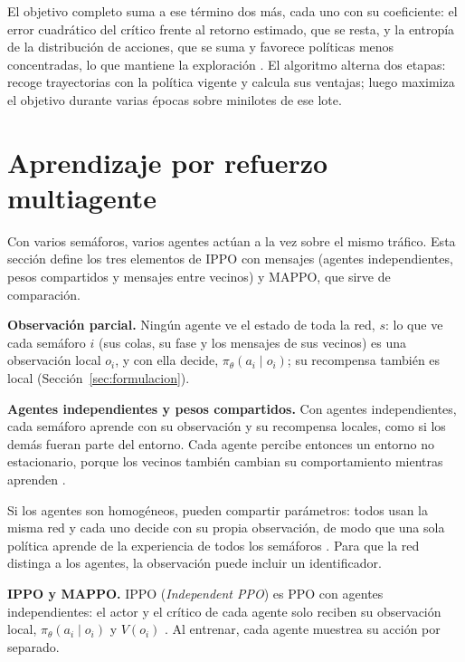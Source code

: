 El objetivo completo suma a ese término dos más, cada uno con su coeficiente: el error cuadrático
del crítico frente al retorno estimado, que se resta, y la entropía de la distribución de
acciones, que se suma y favorece políticas menos concentradas, lo que mantiene la exploración
\citep{Schulman2017_PPO}. El algoritmo alterna dos etapas: recoge trayectorias con la política
vigente y calcula sus ventajas; luego maximiza el objetivo durante varias épocas sobre minilotes
de ese lote.

\section{Aprendizaje por refuerzo multiagente}
\label{sec:marl}

Con varios semáforos, varios agentes actúan a la vez sobre el mismo tráfico. Esta sección define
los tres elementos de IPPO con mensajes (agentes independientes, pesos compartidos y mensajes
entre vecinos) y MAPPO, que sirve de comparación.

\noindent\textbf{Observación parcial.} Ningún agente ve el estado de toda la red, $s$: lo que ve
cada semáforo $i$ (sus colas, su fase y los mensajes de sus vecinos) es una observación local
$o_i$, y con ella decide, $\pi_\theta(a_i \mid o_i)$; su recompensa también es local
(Sección~\ref{sec:formulacion}).

\noindent\textbf{Agentes independientes y pesos compartidos.} Con agentes independientes, cada
semáforo aprende con su observación y su recompensa locales, como si los demás fueran parte del
entorno. Cada agente percibe entonces un entorno no estacionario, porque los vecinos también
cambian su comportamiento mientras aprenden \citep{Yu2021_MAPPO}.

Si los agentes son homogéneos, pueden compartir parámetros: todos usan la misma red y cada uno
decide con su propia observación, de modo que una sola política aprende de la experiencia de todos
los semáforos \citep{Yu2021_MAPPO}. Para que la red distinga a los agentes, la observación puede
incluir un identificador.

\noindent\textbf{IPPO y MAPPO.} IPPO (\textit{Independent PPO}) es PPO con agentes
independientes: el actor y el crítico de cada agente solo reciben su observación local,
$\pi_\theta(a_i \mid o_i)$ y $V(o_i)$ \citep{Yu2021_MAPPO}. Al entrenar, cada agente muestrea su
acción por separado.

